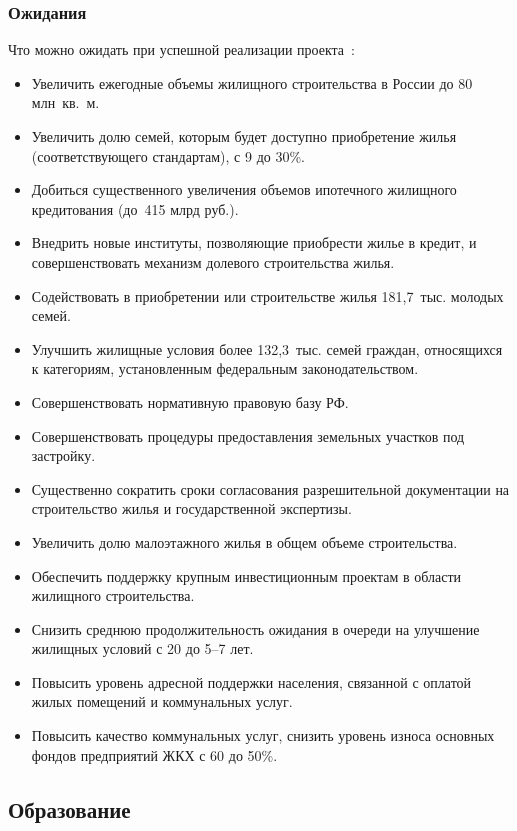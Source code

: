 \documentclass[article, 12pt, russian, oneside]{ncc}
\begin{document}
\subsubsection{Ожидания}

Что можно ожидать при успешной реализации проекта~\cite{Hub_Waitings}:

\begin{itemize}
\item Увеличить ежегодные объемы жилищного строительства в России до
  80 млн~кв.~м.
\item Увеличить долю семей, которым будет доступно приобретение жилья
  (соответствующего стандартам), с 9 до 30\%.
\item Добиться существенного увеличения объемов ипотечного жилищного
  кредитования (до~415 млрд руб.).
\item Внедрить новые институты, позволяющие приобрести жилье в кредит,
  и совершенствовать механизм долевого строительства жилья.
\item Содействовать в приобретении или строительстве жилья
  181,7~тыс. молодых семей.
\item Улучшить жилищные условия более 132,3~тыс. семей граждан,
  относящихся к категориям, установленным федеральным
  законодательством.
\item Совершенствовать нормативную правовую базу РФ.
\item Совершенствовать процедуры предоставления земельных участков под
  застройку.
\item Существенно сократить сроки согласования разрешительной
  документации на строительство жилья и государственной экспертизы.
\item Увеличить долю малоэтажного жилья в общем объеме строительства.
\item Обеспечить поддержку крупным инвестиционным проектам в области
  жилищного строительства.
\item Снизить среднюю продолжительность ожидания в очереди на
  улучшение жилищных условий с 20 до 5--7 лет.
\item Повысить уровень адресной поддержки населения, связанной с
  оплатой жилых помещений и коммунальных услуг.
\item Повысить качество коммунальных услуг, снизить уровень износа
  основных фондов предприятий ЖКХ с 60 до 50\%.
\end{itemize}

\subsection{Образование}
\end{document}
